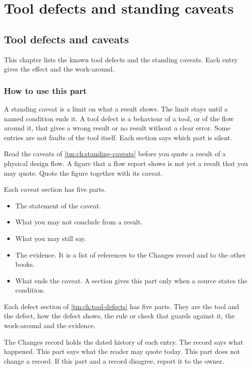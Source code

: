 \part{Tool defects and standing caveats}\label{tm:part:tool-defects-and-standing-caveats}

\chapter{Tool defects and caveats}\label{tm:ch:tool-defects-and-caveats}

This chapter lists the known tool defects and the standing caveats. Each entry gives the effect and the work-around.

\section{How to use this part}\label{tm:ch:tool-defects-and-caveats:use}
A standing caveat is a limit on what a result shows. The limit stays until a named condition ends it. A tool defect is a behaviour of a tool, or of the flow around it, that gives a wrong result or no result without a clear error. Some entries are not faults of the tool itself. Each section says which part is silent.

Read the caveats of \cref{tm:ch:standing-caveats} before you quote a result of a physical design flow. A figure that a flow report shows is not yet a result that you may quote. Quote the figure together with its caveat.

Each caveat section has five parts.
\begin{itemize}
  \item The statement of the caveat.
  \item What you may not conclude from a result.
  \item What you may still say.
  \item The evidence. It is a list of references to the Changes record and to the other books.
  \item What ends the caveat. A section gives this part only when a source states the condition.
\end{itemize}

Each defect section of \cref{tm:ch:tool-defects} has five parts. They are the tool and the defect, how the defect shows, the rule or check that guards against it, the work-around and the evidence.

The Changes record holds the dated history of each entry. The record says what happened. This part says what the reader may quote today. This part does not change a record. If this part and a record disagree, report it to the owner.

